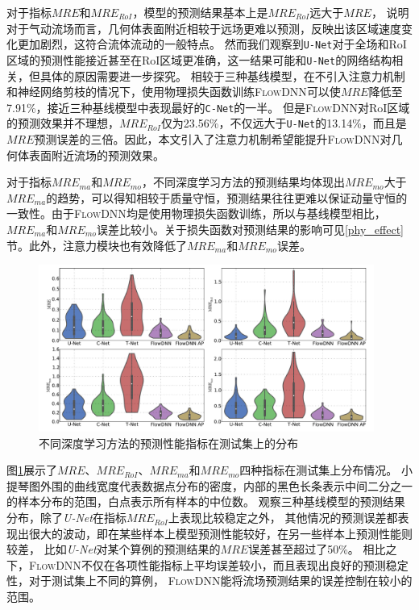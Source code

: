 对于指标$MRE$和$MRE_{RoI}$，模型的预测结果基本上是$MRE_{RoI}$远大于$MRE$，
说明对于气动流场而言，几何体表面附近相较于远场更难以预测，反映出该区域速度变化更加剧烈，这符合流体流动的一般特点。
然而我们观察到\texttt{U-Net}对于全场和RoI区域的预测性能接近甚至在RoI区域更准确，这一结果可能和\texttt{U-Net}的网络结构相关，但具体的原因需要进一步探究。
相较于三种基线模型，在不引入注意力机制和神经网络剪枝的情况下，使用物理损失函数训练\textsc{FlowDNN}可以使$MRE$降低至7.91\%，接近三种基线模型中表现最好的\texttt{C-Net}的一半。
但是\textsc{FlowDNN}对RoI区域的预测效果并不理想，$MRE_{RoI}$仅为23.56\%，不仅远大于\texttt{U-Net}的13.14\%，而且是$MRE$预测误差的三倍。因此，本文引入了注意力机制希望能提升\textsc{FlowDNN}对几何体表面附近流场的预测效果。



对于指标$MRE_{ma}$和$MRE_{mo}$，不同深度学习方法的预测结果均体现出$MRE_{mo}$大于$MRE_{ma}$的趋势，可以得知相较于质量守恒，预测结果往往更难以保证动量守恒的一致性。由于\textsc{FlowDNN}均是使用物理损失函数训练，所以与基线模型相比，$MRE_{ma}$和$MRE_{mo}$误差比较小。关于损失函数对预测结果的影响可见\ref{phy_effect}节。此外，注意力模块也有效降低了$MRE_{ma}$和$MRE_{mo}$误差。



\begin{figure}[htp]
	\centering
	\includegraphics[width=0.98\textwidth]{./figures/data/all_violin.pdf}
	\caption{不同深度学习方法的预测性能指标在测试集上的分布}
	\label{fig:overall_violin}
\end{figure}


图\ref{fig:overall_violin}展示了$MRE$、$MRE_{RoI}$、$MRE_{ma}$和$MRE_{mo}$四种指标在测试集上分布情况。
小提琴图外围的曲线宽度代表数据点分布的密度，内部的黑色长条表示中间二分之一的样本分布的范围，白点表示所有样本的中位数。
观察三种基线模型的预测结果分布，除了\textit{U-Net}在指标$MRE_{RoI}$上表现比较稳定之外，
其他情况的预测误差都表现出很大的波动，即在某些样本上模型预测性能较好，在另一些样本上预测性能则较差，
比如\textit{U-Net}对某个算例的预测结果的$MRE$误差甚至超过了50\%。
相比之下，\textsc{FlowDNN}不仅在各项性能指标上平均误差较小，而且表现出良好的预测稳定性，对于测试集上不同的算例，
\textsc{FlowDNN}能将流场预测结果的误差控制在较小的范围。

